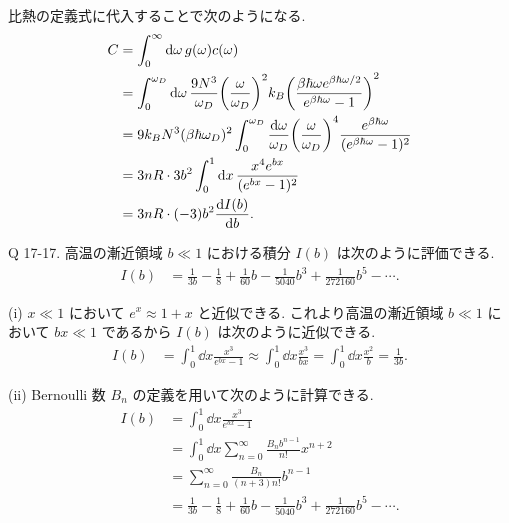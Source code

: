 \documentclass[uplatex,dvipdfmx,a4paper,11pt]{jlreq}
\theoremstyle{definition}
\begin{document}
比熱の定義式に代入することで次のようになる.
\begin{align}
  C & = \int_0^\infty\dd{\omega}g(\omega)c(\omega)                                                                                                                          \\
    & = \int_0^{\omega_D}\dd{\omega}\frac{9N^3}{\omega_D}\qty(\frac{\omega}{\omega_D})^2k_B\qty(\frac{\beta\hbar\omega e^{\beta\hbar\omega/2}}{e^{\beta\hbar\omega} - 1})^2 \\
    & = 9k_BN^3(\beta\hbar\omega_D)^2\int_0^{\omega_D}\frac{\dd{\omega}}{\omega_D}\qty(\frac{\omega}{\omega_D})^4\frac{ e^{\beta\hbar\omega}}{(e^{\beta\hbar\omega} - 1)^2} \\
    & = 3nR\cdot 3b^2\int_0^1\dd{x}\frac{x^4e^{bx}}{(e^{bx} - 1)^2}                                                                                                         \\
    & = 3nR\cdot (-3)b^2\dv{I(b)}{b}.
\end{align}

\begin{itembox}[l]{Q 17-17.}
  高温の漸近領域 $b\ll 1$ における積分 $I(b)$ は次のように評価できる.
  \begin{align}
    I(b) & = \frac{1}{3b} - \frac{1}{8} + \frac{1}{60}b - \frac{1}{5040}b^3 + \frac{1}{272160}b^5 - \cdots.
  \end{align}
\end{itembox}

(i) $x\ll 1$ において $e^x \approx 1 + x$ と近似できる. これより高温の漸近領域 $b\ll 1$ において $bx \ll 1$ であるから $I(b)$ は次のように近似できる.
\begin{align}
  I(b) & = \int_0^1\dd{x}\frac{x^3}{e^{bx} - 1} \approx \int_0^1\dd{x}\frac{x^3}{bx} = \int_0^1\dd{x}\frac{x^2}{b} = \frac{1}{3b}.
\end{align}

(ii) Bernoulli 数 $B_n$ の定義を用いて次のように計算できる.
\begin{align}
  I(b) & = \int_0^1\dd{x}\frac{x^3}{e^{bx} - 1}                                                           \\
       & = \int_0^1\dd{x}\sum_{n=0}^{\infty}\frac{B_n b^{n-1}}{n!}x^{n+2}                                 \\
       & = \sum_{n=0}^{\infty}\frac{B_n}{(n + 3)n!}b^{n-1}                                                \\
       & = \frac{1}{3b} - \frac{1}{8} + \frac{1}{60}b - \frac{1}{5040}b^3 + \frac{1}{272160}b^5 - \cdots.
\end{align}
\end{document}
